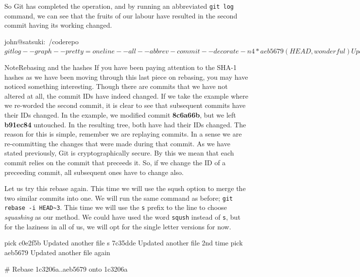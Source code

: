 So Git has completed the operation, and by running an abbreviated \texttt{git log} command, we can see that the fruits of our labour have resulted in the second commit having its working changed.

\begin{code}
john@satsuki:~/coderepo$ git log --graph --pretty=oneline --all --abbrev-commit --decorate -n 4
* aeb5679 (HEAD, wonderful) Updated another file again
* 7c35dde Updated another file 2nd time
* c0e2f5b Updated another file
* 1c3206a (master) Added a new file
john@satsuki:~/coderepo$
\end{code}

\begin{callout}{Note}{Rebasing and the hashes}
If you have been paying attention to the SHA-1 hashes as we have been moving through this last piece on rebasing, you may have noticed something interesting.
Though there are commits that we have not altered at all, the commit IDs have indeed changed.
If we take the example where we re-worded the second commit, it is clear to see that subsequent commits have their IDs changed.
In the example, we modified commit \textbf{8c6a66b}, but we left \textbf{b91ec84} untouched.
In the resulting tree, both have had their IDs changed.
\newline
\newline
The reason for this is simple, remember we are replaying commits.
In a sense we are re-committing the changes that were made during that commit.
As we have stated previously, Git is cryptographically secure.
By this we mean that each commit relies on the commit that preceeds it.
So, if we change the ID of a preceeding commit, all subsequent ones have to change also.
\end{callout}

Let us try this rebase again.
This time we will use the sqush option to merge the two similar commits into one.
We will run the same command as before; \texttt{git rebase -i HEAD\textasciitilde3}.
This time we will use the \texttt{s} prefix to the line to choose \emph{squashing} as our method.
We could have used the word \texttt{sqush} instead of \texttt{s}, but for the laziness in all of us, we will opt for the single letter versions for now.

\begin{code}
pick c0e2f5b Updated another file
s 7c35dde Updated another file 2nd time
pick aeb5679 Updated another file again

# Rebase 1c3206a..aeb5679 onto 1c3206a
\end{code}

